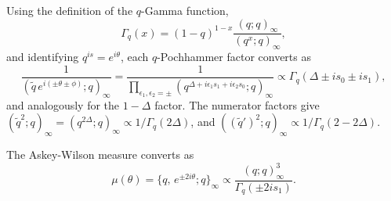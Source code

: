\documentclass[12pt]{scrarticle}
\begin{document}
Using the definition of the $q$-Gamma function,
\begin{equation}
    \Gamma_q(x) = (1-q)^{1-x}\frac{(q;q)_\infty}{(q^x;q)_\infty},
\end{equation}
and identifying $q^{is} = e^{i\theta}$, each $q$-Pochhammer factor converts as
\begin{equation}
    \frac{1}{(\tilde{q}\,e^{i(\pm\theta\pm\phi)};q)_\infty}
    = \frac{1}{\prod_{\epsilon_1,\epsilon_2=\pm}(q^{\Delta+i\epsilon_1 s_1+i\epsilon_2 s_0};q)_\infty}
    \propto \Gamma_q(\Delta \pm is_0 \pm is_1),
    \label{eq:pochhammer_to_gamma}
\end{equation}
and analogously for the $1-\Delta$ factor. The numerator factors give
$(\tilde{q}^2;q)_\infty = (q^{2\Delta};q)_\infty \propto 1/\Gamma_q(2\Delta)$, and
$((\tilde{q}')^2;q)_\infty \propto 1/\Gamma_q(2-2\Delta)$.

The Askey-Wilson measure converts as
\begin{equation}
    \mu(\theta) = \{q,\,e^{\pm 2i\theta}; q\}_\infty \propto \frac{(q;q)_\infty^3}{\Gamma_q(\pm 2is_1)}.
\end{equation}
\end{document}

